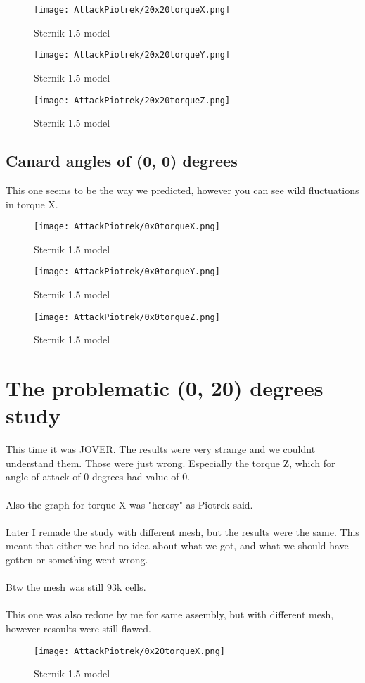\begin{figure}[H]
    \centering
    \texttt{[image: AttackPiotrek/20x20torqueX.png]}
    \caption{Sternik 1.5 model}
\end{figure}

\begin{figure}[H]
    \centering
    \texttt{[image: AttackPiotrek/20x20torqueY.png]}
    \caption{Sternik 1.5 model}
\end{figure}

\begin{figure}[H]
    \centering
    \texttt{[image: AttackPiotrek/20x20torqueZ.png]}
    \caption{Sternik 1.5 model}
\end{figure}

\subsection{Canard angles of (0, 0) degrees}
This one seems to be the way we predicted, however you can see wild fluctuations in torque X.

\begin{figure}[H]
    \centering
    \texttt{[image: AttackPiotrek/0x0torqueX.png]}
    \caption{Sternik 1.5 model}
\end{figure}

\begin{figure}[H]
    \centering
    \texttt{[image: AttackPiotrek/0x0torqueY.png]}
    \caption{Sternik 1.5 model}
\end{figure}

\begin{figure}[H]
    \centering
    \texttt{[image: AttackPiotrek/0x0torqueZ.png]}
    \caption{Sternik 1.5 model}
\end{figure}
\newpage
\section{The problematic (0, 20) degrees study}
This time it was JOVER. The results were very strange and we couldnt understand them. 
Those were just wrong. Especially the torque Z, which for angle of attack of 0 degrees 
had value of 0. \\\\
Also the graph for torque X was "heresy" as Piotrek said. \\\\
Later I remade the study with different mesh, but the results were the same. This
meant that either we had no idea about what we got, and what we should have gotten or 
something went wrong.\\\\
Btw the mesh was still 93k cells. \\\\
This one was also redone by me for same assembly, but with different mesh, however resoults were still
flawed.
\newpage
\begin{figure}[H]
    \centering
    \texttt{[image: AttackPiotrek/0x20torqueX.png]}
    \caption{Sternik 1.5 model}
\end{figure}

